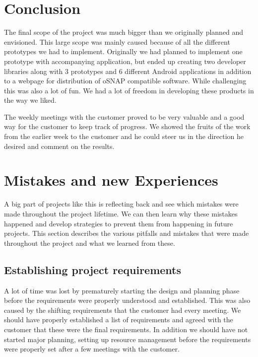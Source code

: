 \section{Conclusion}
The final scope of the project was much bigger than we originally planned and envisioned. This large scope
was mainly caused because of all the different prototypes we had to implement. Originally we had planned
to implement one prototype with accompanying application, but ended up creating two developer libraries
along with 3 prototypes and 6 different Android applications in addition to a webpage for distribution of oSNAP
compatible software. While challenging this was also a lot of fun. We had a lot of freedom in developing
these products in the way we liked.

The weekly meetings with the customer proved to be very valuable and
a good way for the customer to keep track of progress. We showed the fruits of the work from the earlier
week to the customer and he could steer us in the direction he desired and comment on the results.


\section{Mistakes and new Experiences}
A big part of projects like this is reflecting back and see which mistakes were made throughout
the project lifetime. We can then learn why these mistakes happened and develop strategies to
prevent them from happening in future projects. This section describes the various pitfalls and
mistakes that were made throughout the project and what we learned from these.

\subsection{Establishing project requirements}
A lot of time was lost by prematurely starting the design and planning phase before the
requirements were properly understood and established. This was also caused by the shifting 
requirements that the customer had every meeting. We should have properly established a list of
requirements and agreed with the customer that these were the final requirements. In addition we
should have not started major planning, setting up resource management before the requirements
were properly set after a few meetings with the customer.

